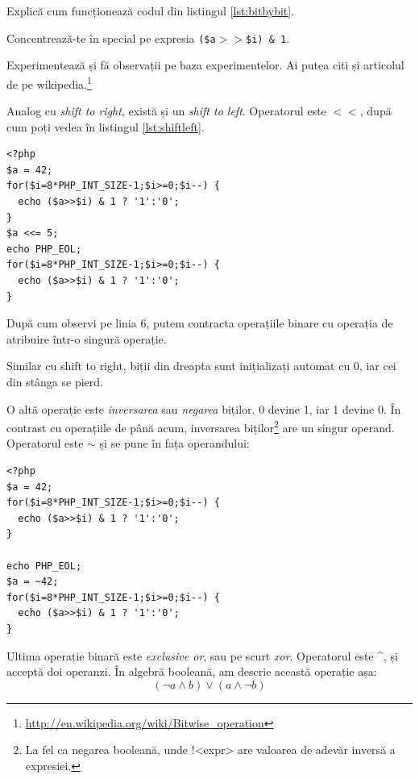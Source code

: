 
\begin{Exercise}[difficulty=3,title={Cum funcționează afișarea bit cu bit a unui int?}]
Explică cum funcționează codul din listingul \ref{lst:bitbybit}.

Concentrează-te
în special pe expresia \texttt{(\$a$>>$\$i) \& 1}.

Experimentează și fă observații pe baza experimentelor. Ai putea citi și articolul
de pe wikipedia.\footnote{\url{http://en.wikipedia.org/wiki/Bitwise_operation}}
\end{Exercise}

Analog cu \textit{shift to right}, există și un \textsl{shift to left}. Operatorul este
\texttt{$<<$}, după cum poți vedea \^in listingul \ref{lst:shiftleft}.
\begin{lstlisting}[label=lst:shiftleft,caption={Operatorul shift to left}]
<?php
$a = 42;
for($i=8*PHP_INT_SIZE-1;$i>=0;$i--) {
  echo ($a>>$i) & 1 ? '1':'0';
}
$a <<= 5;
echo PHP_EOL;
for($i=8*PHP_INT_SIZE-1;$i>=0;$i--) {
  echo ($a>>$i) & 1 ? '1':'0';
}
\end{lstlisting}
După cum observi pe linia 6, putem contracta operațiile binare cu operația de atribuire
într-o singură operație.

Similar cu shift to right, biții din dreapta sunt inițializați automat cu 0, iar cei din
stânga se pierd. 

O altă operație este \textsl{inversarea} sau \textsl{negarea} biților. 0 devine 1, iar 1 devine 0.
În contrast cu operațiile de până acum, inversarea biților\footnote{La fel ca negarea
booleană, unde !<expr> are valoarea de adevăr inversă a expresiei.} are un singur operand.
Operatorul este $\sim$ și se pune în fața operandului: 
\begin{lstlisting}
<?php
$a = 42;
for($i=8*PHP_INT_SIZE-1;$i>=0;$i--) {
  echo ($a>>$i) & 1 ? '1':'0';
}

echo PHP_EOL;
$a = ~42;
for($i=8*PHP_INT_SIZE-1;$i>=0;$i--) {
  echo ($a>>$i) & 1 ? '1':'0';
}
\end{lstlisting}

Ultima operație binară este \textsl{exclusive or}, sau pe scurt
\textsl{xor}. Operatorul este \textasciicircum, și
acceptă doi operanzi. În algebră booleană, am descrie această operație așa:
\[(\lnot a \land b) \lor (a \land \lnot b)\]

